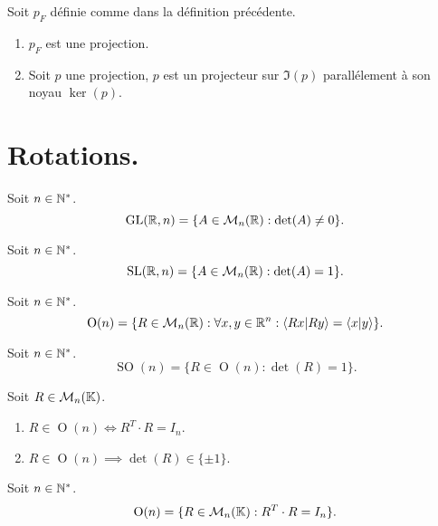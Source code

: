 \begin{proposition}
    Soit $p_F$ définie comme dans la définition précédente.
    \begin{enumerate}
        \item $p_F$ est une projection.
        \item Soit $p$ une projection, $p$ est un projecteur sur $\Im(p)$ parallélement à son noyau $\ker(p)$.
    \end{enumerate}
\end{proposition}

\section{Rotations.}
\begin{definition}
	Soit $n \in \mathbb{N}^*$.
    \[ \operatorname{GL}(\mathbb{R}, n) = \{ A \in \mathcal{M}_n(\mathbb{R}) : \det(A) \neq 0 \}. \]
\end{definition}

\begin{definition}
	Soit $n \in \mathbb{N}^*$.
    \[ \operatorname{SL}(\mathbb{R}, n) = \{ A \in \mathcal{M}_n(\mathbb{R}) : \det(A) = 1 \}. \]
\end{definition}

\begin{definition}
	Soit $n \in \mathbb{N}^*$.
    \[ \operatorname{O}(n) = \{ R \in \mathcal{M}_n(\mathbb{R}) : \forall x, y \in \mathbb{R}^n : \langle Rx|Ry \rangle = \langle x|y \rangle \}. \]
\end{definition}

\begin{definition}
    Soit $n \in \mathbb{N}^*$.
    \[ \operatorname{SO}(n) = \{ R \in \operatorname{O}(n) : \det(R) = 1 \}. \]
\end{definition}

\begin{proposition}
	Soit $R \in \mathcal{M}_n(\mathbb{K})$.
    \begin{enumerate}
        \item $R \in \operatorname{O}(n) \iff R^T \cdot R = I_n$.
        \item $R \in \operatorname{O}(n) \implies \det(R) \in \{ \pm 1 \}$.
    \end{enumerate}
\end{proposition}

\begin{corollary}
	Soit $n \in \mathbb{N}^*$.
    \[ \operatorname{O}(n) = \{ R \in \mathcal{M}_n(\mathbb{K}) : R^T \cdot R = I_n \}. \]
\end{corollary}

